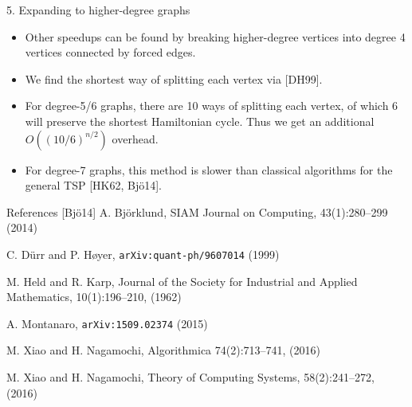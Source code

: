 \documentclass[]{templates/poster}
\begin{document}
\begin{frame}{}
\begin{columns}[t]
\begin{column}{0.422\linewidth}
\begin{block}{\Large 5. Expanding to higher-degree graphs}
\begin{itemize}
  \item Other speedups can be found by breaking higher-degree vertices into degree 4 vertices connected by forced edges.
  
  \item We find the shortest way of splitting each vertex via [DH99].

  \item For degree-5/6 graphs, there are 10 ways of splitting each vertex, of which 6 will preserve the shortest Hamiltonian cycle. Thus we get an additional {\color{uobred} $O((10/6)^{n/2})$} overhead.

  \item For degree-7 graphs, this method is slower than classical algorithms for the general TSP [HK62, Bj\"o14].
  \end{itemize}
  \end{block}

  \begin{block}{\Large References}
  [Bj\"o14] A. Bj{\"o}rklund, SIAM Journal on Computing, 43(1):280--299 (2014)

  \noindent[DH99] C. D\"urr and P. H\o yer, {\tt arXiv:quant-ph/9607014} (1999)

  \noindent[HK62] M. Held and R. Karp, Journal of the Society for Industrial and Applied Mathematics, 10(1):196--210, (1962)

  \noindent[Mon15] A. Montanaro, {\tt arXiv:1509.02374} (2015)

  \noindent[XN16a] M. Xiao and H. Nagamochi, Algorithmica 74(2):713--741, (2016)

  \noindent[XN16b] M. Xiao and H. Nagamochi, Theory of Computing Systems, 58(2):241--272, (2016)
  \end{block}
  \end{column}
\end{columns}

\end{frame}

\end{document}
